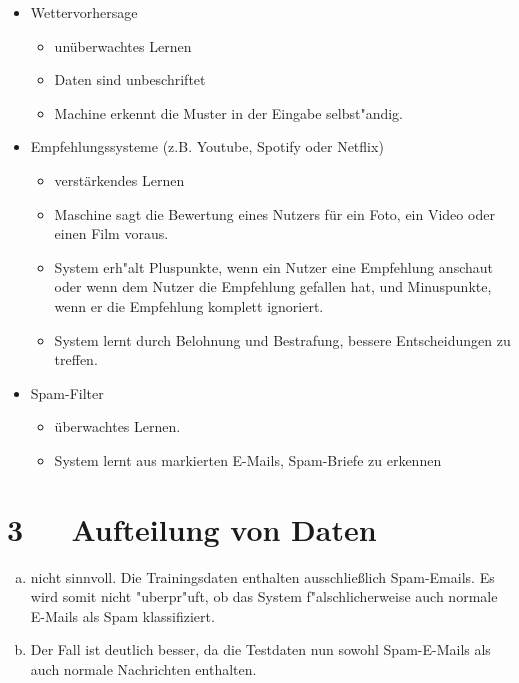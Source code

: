 \documentclass[10pt, oneside]{article}
\begin{document}
\begin{itemize}
    \item Wettervorhersage
        \begin{itemize}
            \item unüberwachtes Lernen
            \item Daten sind unbeschriftet
            \item Machine erkennt die Muster in der Eingabe selbst"andig.
        \end{itemize}

    \item Empfehlungssysteme (z.B. Youtube, Spotify oder Netflix)
        \begin{itemize}
            \item verstärkendes Lernen 
            \item Maschine sagt die Bewertung eines Nutzers für ein Foto, ein
                Video oder einen Film voraus.
            \item System erh"alt Pluspunkte, wenn ein Nutzer eine Empfehlung
                anschaut oder wenn dem Nutzer die Empfehlung gefallen hat, und
                Minuspunkte, wenn er die Empfehlung komplett ignoriert. 
            \item System lernt durch Belohnung und Bestrafung, bessere
                Entscheidungen zu treffen.
        \end{itemize}

    \item Spam-Filter
        \begin{itemize}
            \item überwachtes Lernen.
            \item System lernt aus markierten E-Mails, Spam-Briefe zu erkennen
        \end{itemize}
\end{itemize}

\section{3\ \ \ Aufteilung von Daten}

\begin{enumerate}[(a)]
    \item nicht sinnvoll. Die Trainingsdaten enthalten ausschlie{\ss}lich
        Spam-Emails. Es wird somit nicht "uberpr"uft, ob das System
        f"alschlicherweise auch normale E-Mails als Spam klassifiziert.
    \item Der Fall ist deutlich besser, da die Testdaten nun sowohl Spam-E-Mails als
        auch normale Nachrichten enthalten.
\end{enumerate}
\end{document}
